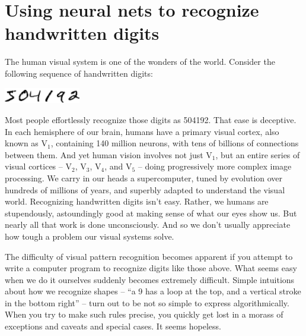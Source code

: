 \documentclass[a4paper,twoside,10pt]{book}
\begin{document}
\chapter{Using neural nets to recognize handwritten digits}

The human visual system is one of the wonders of the world. Consider the following sequence of handwritten digits:
\begin{center}
	\includegraphics[width=0.25\textwidth]{./figures/ch1/digits.png}
\end{center}
Most people effortlessly recognize those digits as 504192. That ease is deceptive. In each hemisphere of our brain, humans have a primary visual cortex, also known as V$_1$, containing 140 million neurons, with tens of billions of connections between them. And yet human vision involves not just V$_1$, but an entire series of visual cortices -- V$_2$, V$_3$, V$_4$, and V$_5$ -- doing progressively more complex image processing. We carry in our heads a supercomputer, tuned by evolution over hundreds of millions of years, and superbly adapted to understand the visual world. Recognizing handwritten digits isn't easy. Rather, we humans are stupendously, astoundingly good at making sense of what our eyes show us. But nearly all that work is done unconsciously. And so we don't usually appreciate how tough a problem our visual systems solve.

The difficulty of visual pattern recognition becomes apparent if you attempt to write a computer program to recognize digits like those above. What seems easy when we do it ourselves suddenly becomes extremely difficult. Simple intuitions about how we recognize shapes -- ``a 9 has a loop at the top, and a vertical stroke in the bottom right'' -- turn out to be not so simple to express algorithmically. When you try to make such rules precise, you quickly get lost in a morass of exceptions and caveats and special cases. It seems hopeless.
\end{document}

